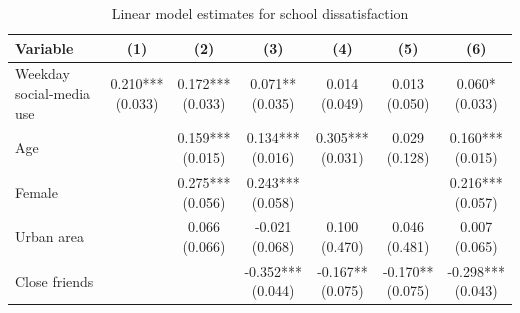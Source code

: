 \begin{table}[!htbp]
\centering
\caption{Linear model estimates for school dissatisfaction}
\label{tab:linear_models_school}
\scriptsize
\setlength{\tabcolsep}{3.2pt}
\renewcommand{\arraystretch}{0.9}
\begin{tabular}{p{}cccccc}
\hline
Variable & (1) & (2) & (3) & (4) & (5) & (6) \\
\hline
Weekday social-media use & \shortstack[c]{0.210*** \\[-0.35ex] (0.033)} & \shortstack[c]{0.172*** \\[-0.35ex] (0.033)} & \shortstack[c]{0.071** \\[-0.35ex] (0.035)} & \shortstack[c]{0.014 \\[-0.35ex] (0.049)} & \shortstack[c]{0.013 \\[-0.35ex] (0.050)} & \shortstack[c]{0.060* \\[-0.35ex] (0.033)}
\\
Age &  & \shortstack[c]{0.159*** \\[-0.35ex] (0.015)} & \shortstack[c]{0.134*** \\[-0.35ex] (0.016)} & \shortstack[c]{0.305*** \\[-0.35ex] (0.031)} & \shortstack[c]{0.029 \\[-0.35ex] (0.128)} & \shortstack[c]{0.160*** \\[-0.35ex] (0.015)}
\\
Female &  & \shortstack[c]{0.275*** \\[-0.35ex] (0.056)} & \shortstack[c]{0.243*** \\[-0.35ex] (0.058)} &  &  & \shortstack[c]{0.216*** \\[-0.35ex] (0.057)}
\\
Urban area &  & \shortstack[c]{0.066 \\[-0.35ex] (0.066)} & \shortstack[c]{-0.021 \\[-0.35ex] (0.068)} & \shortstack[c]{0.100 \\[-0.35ex] (0.470)} & \shortstack[c]{0.046 \\[-0.35ex] (0.481)} & \shortstack[c]{0.007 \\[-0.35ex] (0.065)}
\\
Close friends &  &  & \shortstack[c]{-0.352*** \\[-0.35ex] (0.044)} & \shortstack[c]{-0.167** \\[-0.35ex] (0.075)} & \shortstack[c]{-0.170** \\[-0.35ex] (0.075)} & \shortstack[c]{-0.298*** \\[-0.35ex] (0.043)}

\end{tabular}
\end{table}
